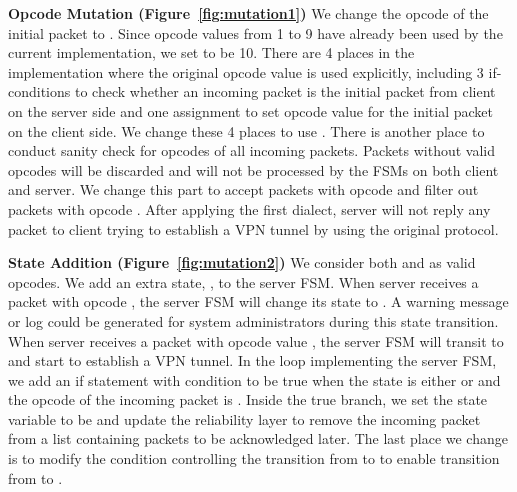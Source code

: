 {\textbf{Opcode Mutation (Figure~\ref{fig:mutation1})}}
We change the opcode of the initial packet to .
Since opcode values from 1 to 9 have already been used by the current implementation,
we set  to be 10.
There are 4 places in the implementation where the original opcode value is used explicitly, 
including 3 if-conditions to check whether an incoming packet is the initial packet from client on the server side 
and one assignment to set opcode value for the initial packet on the client side. 
We change these 4 places to use .
There is another place to conduct sanity check for opcodes of all incoming packets. 
Packets without valid opcodes will be discarded 
and will not be processed by the FSMs on both client and server.
We change this part to accept packets with opcode  
and filter out packets with opcode .
After applying the first dialect, 
server will not reply any packet to client trying to 
establish a VPN tunnel by using the original protocol. 



{\textbf{State Addition (Figure~\ref{fig:mutation2})}}
We consider both  
and  as valid opcodes. 
We add an extra state, , to the server FSM. 
When server receives a packet with opcode , 
the server FSM will change its state to . 
A warning message or log could be generated for system administrators during this state transition.
When server receives a packet with opcode value ,
the server FSM will transit to  and start to establish a VPN tunnel.
In the loop implementing the server FSM, we add an if statement with condition to be true 
when the state is either  or  
and the opcode of the incoming packet is . 
Inside the true branch, we set the state variable to be  
and update the reliability layer to remove the incoming packet 
from a list containing packets to be acknowledged later. 
The last place we change is to modify the condition controlling the transition from  
to  to enable transition from  to .



